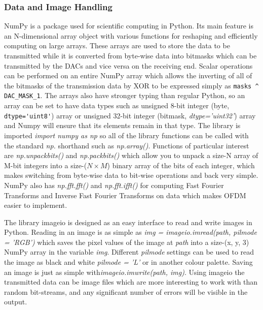 \documentclass[../main.tex]{subfiles}
\begin{document}
\subsubsection{Data and Image Handling}

NumPy is a package used for scientific computing in Python.
Its main feature is an N-dimensional array object with various functions for reshaping and efficiently computing on large arrays.
These arrays are used to store the data to be transmitted while it is converted from byte-wise data into bitmasks which can be transmitted by the DACs and vice versa on the receiving end.
Scalar operations can be performed on an entire NumPy array which allows the inverting of all of the bitmasks of the transmission data by XOR to be expressed simply as \colorbox{backcolour}{\lstinline{masks ^ DAC_MASK_1}}.
The arrays also have stronger typing than regular Python, so an array can be set to have data types such as unsigned 8-bit integer (byte, \colorbox{backcolour}{\lstinline{dtype='uint8'}}) array or unsigned 32-bit integer (bitmask, \textit{dtype='uint32'}) array and Numpy will ensure that its elements remain in that type.
The library is imported \textit{import numpy as np} so all of the library functions can be called with the standard \textit{np.} shorthand such as \textit{np.array()}.
Functions of particular interest are \textit{np.unpackbits()} and \textit{np.packbits()} which allow you to unpack a size-N array of M-bit integers into a size-($N\times M$) binary array of the bits of each integer, which makes switching from byte-wise data to bit-wise operations and back very simple.
NumPy also has \textit{np.fft.fft()} and \textit{np.fft.ifft()} for computing Fast Fourier Transforms and Inverse Fast Fourier Transforms on data which makes OFDM easier to implement.

The library imageio is designed as an easy interface to read and write images in Python.
Reading in an image is as simple as \textit{img = imageio.imread(path, pilmode = 'RGB')} which saves the pixel values of the image at \textit{path} into a size-(x, y, 3) NumPy array in the variable \textit{img}.
Different \textit{pilmode} settings can be used to read the image as black and white \textit{pilmode = 'L'} or in another colour palette.
Saving an image is just as simple with\textit{imageio.imwrite(path, img)}.
Using imageio the transmitted data can be image files which are more interesting to work with than random bit-streams, and any significant number of errors will be visible in the output.\\
\end{document}
